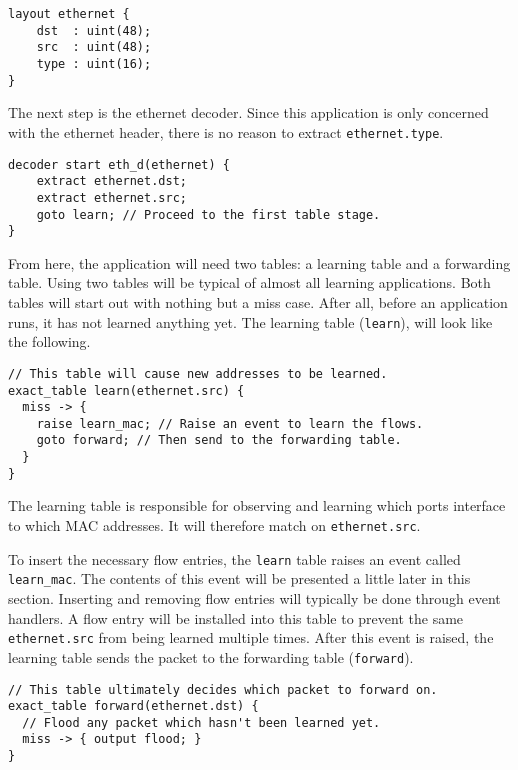 \begin{codepage}
\begin{lstlisting}
layout ethernet {
	dst  : uint(48);
	src  : uint(48);
	type : uint(16);
}
\end{lstlisting}
\end{codepage}

The next step is the ethernet decoder. 
Since this application is only concerned with the
ethernet header, there is no reason to extract \texttt{ethernet.type}.

\begin{codepage}
\begin{lstlisting}
decoder start eth_d(ethernet) {
	extract ethernet.dst;
	extract ethernet.src;
	goto learn; // Proceed to the first table stage.
}
\end{lstlisting}
\end{codepage}

From here, the application will need two tables: a learning table and a forwarding table.
Using two tables will be typical of almost all learning applications. Both
tables will start out with nothing but a miss case. After all, before an
application runs, it has not learned anything yet. 
The learning table (\texttt{learn}), will look like the following.

\begin{codepage}
\begin{lstlisting}
// This table will cause new addresses to be learned.
exact_table learn(ethernet.src) {
  miss -> {
  	raise learn_mac; // Raise an event to learn the flows.
    goto forward; // Then send to the forwarding table.
  }
}
\end{lstlisting}
\end{codepage}

The learning table is responsible for observing and learning which
ports interface to which MAC addresses.
It will therefore match on \texttt{ethernet.src}. 

To insert the necessary flow entries, the \texttt{learn} table raises an event
called \texttt{learn\_mac}. The contents of this event will be presented a little later in this section.
Inserting and removing flow entries will typically be done through event handlers.
A flow entry will be installed into this
table to prevent the same \texttt{ethernet.src} from being learned multiple
times.
After this event is raised, the learning table sends the packet to the
forwarding table (\texttt{forward}).

\begin{codepage}
\begin{lstlisting}
// This table ultimately decides which packet to forward on.
exact_table forward(ethernet.dst) {
  // Flood any packet which hasn't been learned yet.
  miss -> { output flood; }
}
\end{lstlisting}
\end{codepage}

